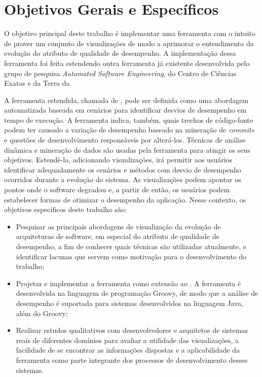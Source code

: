 
\section{Objetivos Gerais e Específicos} \label{sec:objetivos-gerais-especificos}

O objetivo principal deste trabalho é implementar uma ferramenta com o intuito de prover um conjunto de visualizações de modo a aprimorar o entendimento da evolução do atributo de qualidade de desempenho. A implementação dessa ferramenta foi feita estendendo outra ferramenta já existente desenvolvida pelo grupo de pesquisa \textit{Automated Software Engineering}, do Centro de Ciências Exatas e da Terra da 

A ferramenta estendida, chamada de \textit{\perfMinerName} \cite{Pinto2015}, pode ser definida como uma abordagem automatizada baseada em cenários para identificar desvios de desempenho em tempo de execução. A ferramenta indica, também, quais trechos de código-fonte podem ter causado a variação de desempenho baseado na mineração de \textit{commits} e questões de desenvolvimento responsáveis por alterá-los. Técnicas de análise dinâmica e mineração de dados são usadas pela ferramenta para atingir os seus objetivos. Estendê-la, adicionando visualizações, irá permitir aos usuários identificar adequadamente os cenários e métodos com desvio de desempenho ocorridos durante a evolução do sistema. As visualizações podem apontar os pontos onde o software degradou e, a partir de então, os usuários podem estabelecer formas de otimizar o desempenho da aplicação. Nesse contexto, os objetivos específicos deste trabalho são:
\begin{itemize}
	\item Pesquisar as principais abordagens de visualização da evolução de arquiteturas de software, em especial do atributo de qualidade de desempenho, a fim de conhecer quais técnicas são utilizadas atualmente, e identificar lacunas que servem como motivação para o desenvolvimento do trabalho;
	\item Projetar e implementar a ferramenta {\toolName} como extensão ao \textit{\perfMinerName}. A ferramenta é desenvolvida na linguagem de programação Groovy, de modo que a análise de desempenho é suportada para sistemas desenvolvidos na linguagem Java, além do Groovy;
	\item Realizar estudos qualitativos com desenvolvedores e arquitetos de sistemas reais de diferentes domínios para avaliar a utilidade das visualizações, a facilidade de se encontrar as informações dispostas e a aplicabilidade da ferramenta como parte integrante dos processos de desenvolvimento desses sistemas.
\end{itemize}

